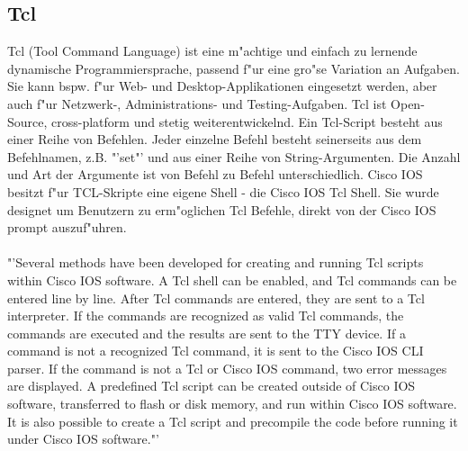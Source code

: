 \documentclass[a4paper,12pt]{scrreprt}
\begin{document}
\subsection{Tcl}
Tcl (Tool Command Language) ist eine m"achtige und einfach zu lernende dynamische Programmiersprache, passend f"ur eine gro"se Variation an Aufgaben. Sie kann bspw. f"ur Web- und Desktop-Applikationen eingesetzt werden, aber auch f"ur Netzwerk-, Administrations- und Testing-Aufgaben. Tcl ist Open-Source, cross-platform und stetig weiterentwickelnd. Ein Tcl-Script besteht aus einer Reihe von Befehlen. Jeder einzelne Befehl besteht seinerseits aus dem Befehlnamen, z.B. "'set"' und aus einer Reihe von String-Argumenten. Die Anzahl und Art der Argumente ist von Befehl zu Befehl unterschiedlich. \cite{tcl1} Cisco IOS besitzt f"ur TCL-Skripte eine eigene Shell - die Cisco IOS Tcl Shell. Sie wurde designet um Benutzern zu erm"oglichen Tcl Befehle, direkt von der Cisco IOS prompt auszuf"uhren. \\\\
"'Several methods have been developed for creating and running Tcl scripts within Cisco IOS software. A Tcl shell can be enabled, and Tcl commands can be entered line by line. After Tcl commands are entered, they are sent to a Tcl interpreter. If the commands are recognized as valid Tcl commands, the commands are executed and the results are sent to the TTY device. If a command is not a recognized Tcl command, it is sent to the Cisco IOS CLI parser. If the command is not a Tcl or Cisco IOS command, two error messages are displayed. A predefined Tcl script can be created outside of Cisco IOS software, transferred to flash or disk memory, and run within Cisco IOS software. It is also possible to create a Tcl script and precompile the code before running it under Cisco IOS software."'\cite{tcl2}
\end{document}
